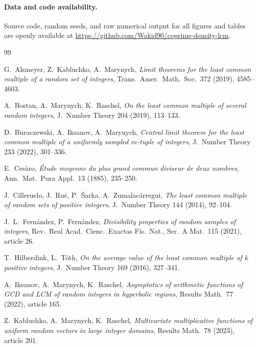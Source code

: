 \documentclass[11pt]{article}
\theoremstyle{remark}
\begin{document}
\paragraph{Data and code availability.}
Source code, random seeds, and raw numerical output for all figures and tables are openly available at \url{https://github.com/Wakid90/coprime-density-lcm}.

\begin{thebibliography}{99}

G.~Alsmeyer, Z.~Kabluchko, A.~Marynych, \emph{Limit theorems for the least common multiple of a random set of integers}, Trans.\ Amer.\ Math.\ Soc.\ 372 (2019), 4585--4603.

A.~Bostan, A.~Marynych, K.~Raschel, \emph{On the least common multiple of several random integers}, J.\ Number Theory 204 (2019), 113--133.

D.~Buraczewski, A.~Iksanov, A.~Marynych, \emph{Central limit theorem for the least common multiple of a uniformly sampled $m$-tuple of integers}, J.\ Number Theory 233 (2022), 301--336.

E.~Ces\`aro, \emph{\'Etude moyenne du plus grand commun diviseur de deux nombres}, Ann.\ Mat.\ Pura Appl.\ 13 (1885), 235--250.

J.~Cilleruelo, J.~Ru\'e, P.~\v{S}arka, A.~Zumalac\'arregui, \emph{The least common multiple of random sets of positive integers}, J.\ Number Theory 144 (2014), 92--104.

J.~L.~Fern\'andez, P.~Fern\'andez, \emph{Divisibility properties of random samples of integers}, Rev.\ Real Acad.\ Cienc.\ Exactas F\'is.\ Nat., Ser.\ A Mat.\ 115 (2021), article 26.

T.~Hilberdink, L.~T\'oth, \emph{On the average value of the least common multiple of $k$ positive integers}, J.\ Number Theory 169 (2016), 327--341.

A.~Iksanov, A.~Marynych, K.~Raschel, \emph{Asymptotics of arithmetic functions of GCD and LCM of random integers in hyperbolic regions}, Results Math.\ 77 (2022), article 165.

Z.~Kabluchko, A.~Marynych, K.~Raschel, \emph{Multivariate multiplicative functions of uniform random vectors in large integer domains}, Results Math.\ 78 (2023), article 201.


\end{thebibliography}
\end{document}
